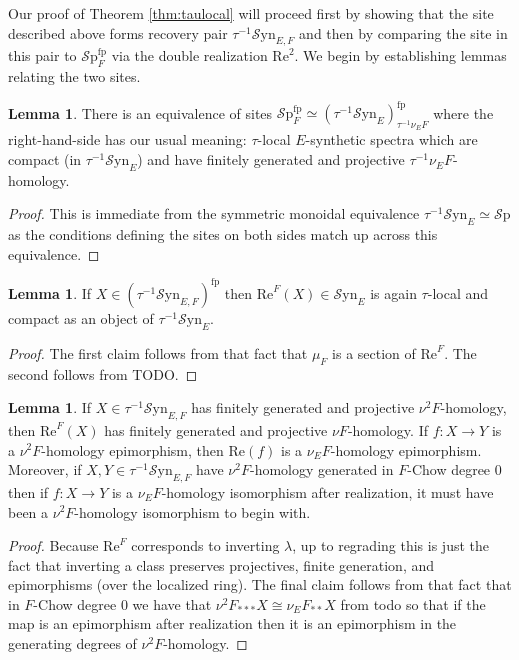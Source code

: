 \documentclass[10pt]{amsart}
\theoremstyle{definition}
\numberwithin{figure}{section}
\numberwithin{equation}{section}
\newtheorem{lemma}[figure]{Lemma}
\theoremstyle{cited}
\newcommand{\Sp}{{\mathcal{S}\mathrm{p}}}
\newcommand{\fp}{\mathrm{fp}}
\newcommand{\Syn}{\mathcal{S}\mathrm{yn}}
\renewcommand{\Re}{\mathrm{Re}}
\begin{document}
Our proof of Theorem \ref{thm:taulocal} will proceed first by showing that the site described above forms recovery pair $\tau^{-1}\Syn_{E,F}$ and then by comparing the site in this pair to $\Sp_F^\fp$ via the double realization $\Re^2$. We begin by establishing lemmas relating the two sites.

\begin{lemma}
  There is an equivalence of sites $\Sp_F^\fp\simeq (\tau^{-1}\Syn_E)^{\fp}_{\tau^{-1}\nu_E F}$ where the right-hand-side has our usual meaning: $\tau$-local $E$-synthetic spectra which are compact (in $\tau^{-1}\Syn_E$) and have finitely generated and projective $\tau^{-1}\nu_EF$-homology.
\end{lemma}

\begin{proof}
  This is immediate from the symmetric monoidal equivalence $\tau^{-1}\Syn_{E}\simeq \Sp$ as the conditions defining the sites on both sides match up across this equivalence.
\end{proof}

\begin{lemma}
  If $X\in (\tau^{-1}\Syn_{E,F})^\fp$ then $\Re^F(X)\in \Syn_E$ is again $\tau$-local and compact as an object of $\tau^{-1}\Syn_E$.
\end{lemma}

\begin{proof}
  The first claim follows from that fact that $\mu_F$ is a section of $\Re^{F}$. The second follows from TODO.
\end{proof}

\begin{lemma}
  If $X\in \tau^{-1}\Syn_{E,F}$ has finitely generated and projective $\nu^2F$-homology, then $\Re^F(X)$ has finitely generated and projective $\nu F$-homology. If $f:X\to Y$ is a $\nu^2F$-homology epimorphism, then $\Re(f)$ is a $\nu_E F$-homology epimorphism. Moreover, if $X,Y\in \tau^{-1}\Syn_{E,F}$ have $\nu^2F$-homology generated in $F$-Chow degree $0$ then if $f:X\to Y$ is a $\nu_EF$-homology isomorphism after realization, it must have been a $\nu^2F$-homology isomorphism to begin with.
\end{lemma}

\begin{proof}
  Because $\Re^F$ corresponds to inverting $\lambda$, up to regrading this is just the fact that inverting a class preserves projectives, finite generation, and epimorphisms (over the localized ring). The final claim follows from that fact that in $F$-Chow degree $0$ we have that $\nu^2F_{***}X\cong \nu_E F_{**}X$ from todo so that if the map is an epimorphism after realization then it is an epimorphism in the generating degrees of $\nu^2F$-homology.
\end{proof}
\end{document}
